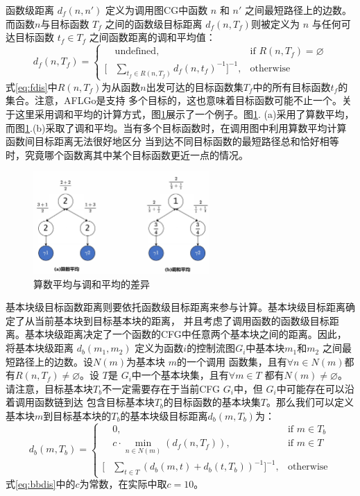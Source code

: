 \documentclass[bachelor]{njupthesis}
\begin{document}
函数级距离 $d_f(n, n')$ 定义为调用图CG中函数 $n$ 和 $n'$ 之间最短路径上的边数。而函数$n$与目标函数 $T_f$ 
之间的函数级目标距离 $d_f (n,T_f) $则被定义为 $n$ 与任何可达目标函数 $t_f \in T_f$ 之间函数距离的调和平均值：
 \begin{equation}\label{eq:fdis}
	d_f(n,T_f)=\left\{ \begin{aligned}
		&\text{undefined} , &\text{if } R(n,T_f)=\varnothing \\
	   [&\sum\limits_{t_f\in R(n,T_f)} d_f(n,t_f)^{-1}]^{-1} , &\text{otherwise} 
   \end{aligned}
   \right.
 \end{equation}
式\ref{eq:fdis}中$R(n,T_f)$为从函数$n$出发可达的目标函数集$T_f$中的所有目标函数$t_f$的集合。注意，AFLGo是支持
多个目标的，这也意味着目标函数可能不止一个。关于这里采用调和平均的计算方式，图\ref{pic:diff}展示了一个例子。图\ref{pic:diff}.
(a)采用了算数平均，而图\ref{pic:diff}.(b)采取了调和平均。当有多个目标函数时，在调用图中利用算数平均计算函数间目标距离无法很好地区分
当到达不同目标函数的最短路径总和恰好相等时，究竟哪个函数离其中某个目标函数更近一点的情况。

\begin{figure}[htbp]
	\centering
	\includegraphics[width=0.6\textwidth]{pic/diff.pdf}
	\caption{算数平均与调和平均的差异}
 	\label{pic:diff}
\end{figure}

基本块级目标函数距离则要依托函数级目标距离来参与计算。基本块级目标距离确定了从当前基本块到目标基本块的距离，
并且考虑了调用函数的函数级目标距离。基本块级距离决定了一个函数的CFG中任意两个基本块之间的距离。因此，将基本块级距离
$d_b(m_1, m_2)$ 定义为函数$i$的控制流图$G_i$中基本块$m_1$和$m_2$ 之间最短路径上的边数。设$N(m)$为基本块 $m$的一个调用
函数集，且有$\forall n \in N (m)$都有$R(n,T_f) \neq \varnothing$。设 $T$是 $G_i$中一个基本块集，且有$\forall m \in T$ 
都有$N(m)\neq \varnothing$。请注意，目标基本块$T_b$不一定需要存在于当前CFG $G_i$中，但 $G_i$中可能存在可以沿着调用函数链到达
包含目标基本块$T_b$的目标函数的基本块集$T$。那么我们可以定义基本块$m$到目标基本块的$T_b$的基本块级目标距离$d_b(m,T_b)$为：
\begin{equation}\label{eq:bbdis}
	d_b(m,T_b)=\left\{ \begin{aligned}
		&0 ,&\text{if } m \in T_b \\
		&c \cdot \min \limits_{n\in N(m)}(d_f(n,T_f)) , &\text{if } m \in T \\
	   [&\sum\limits_{t\in T} (d_b(m,t)+d_b(t,T_b))^{-1}]^{-1} , &\text{otherwise} 
   \end{aligned}
   \right.
 \end{equation}
式\ref{eq:bbdis}中的$c$为常数，在实际中取$c=10$。
\end{document}
